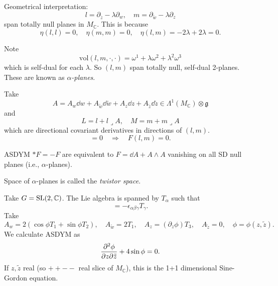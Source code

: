 \documentclass[a4paper,11pt]{article}
\begin{document}
    Geometrical interpretation: 
    \begin{equation}
        l = \partial_{\tilde z} - \lambda \partial_w, \quad m = \partial_{\tilde w} - \lambda \partial_z
    \end{equation} 
    span totally null planes in $M_{\mathbb{C}}$. This is because 
    \begin{equation}
        \eta(l,l) = 0, \quad \eta(m,m) = 0, \quad \eta(l,m) = -2 \lambda + 2 \lambda = 0.
    \end{equation}

    Note 
    \begin{equation}
        \text{vol}(l,m,\cdot,\cdot) = \omega^1 + \lambda \omega^2 + \lambda^2 \omega^3
    \end{equation}
    which is self-dual for each $\lambda$. So $(l,m)$ span totally null, self-dual 2-planes. These are known as \emph{$\alpha$-planes}.

     Take 
    \begin{equation}
        A = A_w \dd{w} + A_{\tilde w} \dd{\tilde w} + A_z \dd{z} + A_{\tilde z} \dd{\tilde z} \in \Lambda^1(M_{\mathbb{C}}) \otimes \mathfrak{g}
    \end{equation}
    and 
    \begin{equation}
        L = l + l \lrcorner A, \quad M = m + m \lrcorner A
    \end{equation}
    which are directional covariant derivatives in directions of $(l,m)$. 
    \begin{equation}
        [L,M] = 0 \quad \Rightarrow \quad F(l,m) = 0.
    \end{equation}

    \begin{thm}
        ASDYM $*F = -F$ are equivalent to $F= \dd{A} + A \wedge A$ vanishing on all SD null planes (i.e., $\alpha$-planes).
    \end{thm}
    \begin{rmk}
        Space of $\alpha$-planes is called the \emph{twistor space}.
    \end{rmk}

    \begin{ex}
        Take $G = \operatorname{SL}(2,\mathbb{C})$. The Lie algebra is spanned by $T_\alpha$ such that 
        \begin{equation}
            [T_\alpha, T_\beta] = - \epsilon_{\alpha \beta \gamma} T_\gamma.
        \end{equation} 
        Take 
        \begin{equation}
            A_w = 2(\cos \phi T_1 + \sin \phi T_2), \quad A_{\tilde w} = 2 T_1, \quad A_z = (\partial_z \phi) T_3, \quad A_{\tilde z} = 0, \quad \phi = \phi(z,\tilde z).
        \end{equation}
        We calculate ASDYM as 
        \begin{equation}
            \pdv{\phi}{z}{\tilde z} + 4 \sin \phi = 0.
        \end{equation}
        If $z, \tilde z$ real (so ${+}{+}{-}{-}$ real slice of $M_{\mathbb{C}}$), this is the 1+1 dimensional Sine-Gordon equation.
    \end{ex}
    \newpage 
\end{document}
